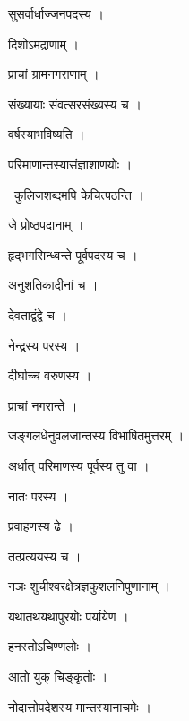 \documentclass[10pt, openany, oneside]{book}
\begin{document}
\noindent सुसर्वार्धाज्जनपदस्य ।

\noindent दिशोऽमद्राणाम् ।

\noindent प्राचां ग्रामनगराणाम् ।

\noindent संख्यायाः संवत्सरसंख्यस्य च ।

\noindent वर्षस्याभविष्यति ।

\noindent परिमाणान्तस्यासंज्ञाशाणयोः ।

\par\noindent\hspace{1.5em}{\vps वा॰}~{\qt कुलिजशब्दमपि केचित्पठन्ति ।}

\noindent जे प्रोष्ठपदानाम् ।

\noindent हृद्भगसिन्ध्वन्ते पूर्वपदस्य च ।

\noindent अनुशतिकादीनां च ।

\noindent देवताद्वंद्वे च ।

\noindent नेन्द्रस्य परस्य ।

\noindent दीर्घाच्च वरुणस्य ।

\noindent प्राचां नगरान्ते ।

\noindent जङ्गलधेनुवलजान्तस्य विभाषितमुत्तरम् ।

\noindent अर्धात् परिमाणस्य पूर्वस्य तु वा ।

\noindent नातः परस्य ।

\noindent प्रवाहणस्य ढे ।

\noindent तत्प्रत्ययस्य च ।

\noindent नञः शुचीश्वरक्षेत्रज्ञकुशलनिपुणानाम् ।

\noindent यथातथयथापुरयोः पर्यायेण ।

\noindent हनस्तोऽचिण्णलोः ।

\noindent आतो युक् चिङ्कृतोः ।

\noindent नोदात्तोपदेशस्य मान्तस्यानाचमेः ।
\end{document}
